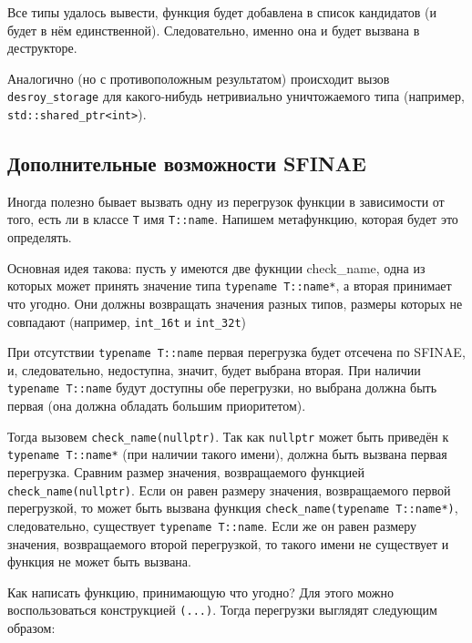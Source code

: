 	Все типы удалось вывести, функция будет добавлена в список кандидатов (и будет в нём единственной). Следовательно, именно она и будет вызвана в деструкторе.
	
	\vspace{\baselineskip}		
	
	Аналогично (но с противоположным результатом) происходит вызов \texttt{desroy_storage} для какого-нибудь нетривиально уничтожаемого типа (например, \texttt{std::shared_ptr<int>}).

	\subsection{Дополнительные возможности SFINAE}
	
	Иногда полезно бывает вызвать одну из перегрузок функции в зависимости от того, есть ли в классе \texttt{T} имя \texttt{T::name}. Напишем метафункцию, которая будет это определять.

	Основная идея такова: пусть у имеются две фукнции check\_name, одна из которых может принять значение типа \texttt{typename T::name*}, а вторая принимает что угодно. Они должны возвращать значения разных типов, размеры которых не совпадают (например, \texttt{int_16t} и \texttt{int_32t})
	
	При отсутствии \texttt{typename T::name} первая перегрузка будет отсечена по SFINAE, и, следовательно, недоступна, значит, будет выбрана вторая. При наличии \texttt{typename T::name} будут доступны обе перегрузки, но выбрана должна быть первая (она должна обладать большим приоритетом). 

	Тогда вызовем \texttt{check_name(nullptr)}. Так как \texttt{nullptr} может быть приведён к \texttt{typename T::name*} (при наличии такого имени), должна быть вызвана первая перегрузка. Сравним размер значения, возвращаемого функцией \texttt{check_name(nullptr)}. Если он равен размеру значения, возвращаемого первой перегрузкой, то может быть вызвана функция \texttt{check_name(typename T::name*)}, следовательно, существует \texttt{typename T::name}. Если же он равен размеру значения, возвращаемого второй перегрузкой, то такого имени не существует и функция не может быть вызвана.
	
	Как написать функцию, принимающую что угодно? Для этого можно воспользоваться конструкцией \texttt{(...)}. Тогда перегрузки выглядят следующим образом:

